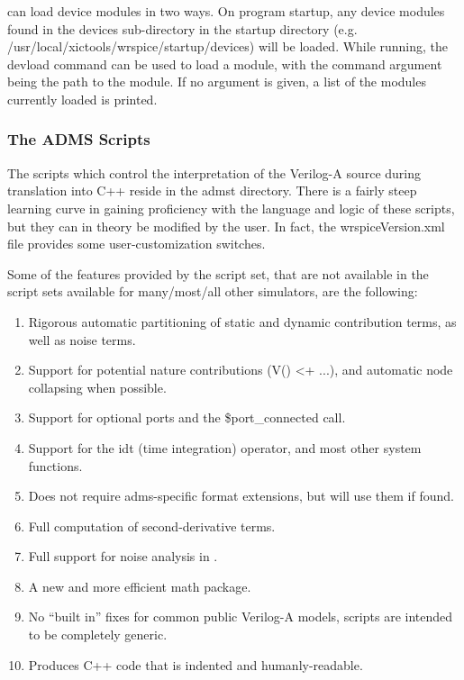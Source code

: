 {\WRspice} can load device modules in two ways.  On program startup,
any device modules found in the {\vt devices} sub-directory in the
startup directory (e.g. {\vt
/usr/local/xictools/wrspice/startup/devices}) will be loaded.  While
running, the {\WRspice} {\cb devload} command can be used to load a
module, with the command argument being the path to the module.  If no
argument is given, a list of the modules currently loaded is printed.

\subsubsection{The ADMS Scripts}

The scripts which control the interpretation of the Verilog-A source
during translation into C++ reside in the {\vt admst} directory. 
There is a fairly steep learning curve in gaining proficiency with the
language and logic of these scripts, but they can in theory be
modified by the user.  In fact, the {\vt wrspiceVersion.xml} file
provides some user-customization switches.

Some of the features provided by the {\WRspice} script set, that are
not available in the script sets available for many/most/all other
simulators, are the following:

\begin{enumerate}
\item {Rigorous automatic partitioning of static and dynamic
    contribution terms, as well as noise terms.}
\item {Support for potential nature contributions ({\vt V() <+} ...),
    and automatic node collapsing when possible.}
\item {Support for optional ports and the {\vt \$port\_connected}
    call.}
\item {Support for the {\vt idt} (time integration) operator, and
    most other system functions.}
\item {Does not require adms-specific format extensions, but will use
    them if found.}
\item {Full computation of second-derivative terms.}
\item {Full support for noise analysis in {\WRspice}.}
\item {A new and more efficient math package.}
\item {No ``built in'' fixes for common public Verilog-A models, scripts
    are intended to be completely generic.}
\item {Produces C++ code that is indented and humanly-readable.}
\end{enumerate}

